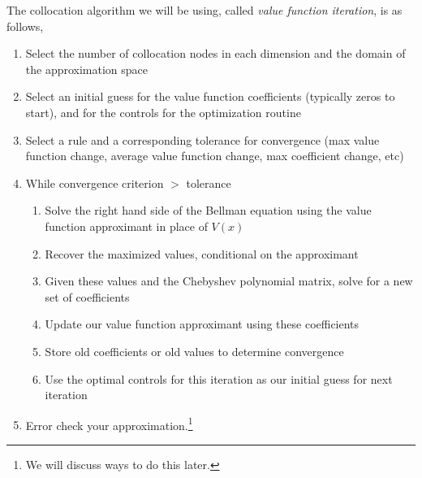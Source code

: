 \documentclass[11pt]{article}%
\begin{document}
The collocation algorithm we will be using, called \emph{value function iteration}, is as follows,
\begin{enumerate} \itemsep -.05in\vspace{-.1in}
	\item Select the number of collocation nodes in each dimension and the domain of the approximation space
	\item Select an initial guess for the value function coefficients (typically zeros to start), and for the controls for the optimization routine
	\item Select a rule and a corresponding tolerance for convergence (max value function change, average value function change, max coefficient change, etc)
	\item While convergence criterion $>$ tolerance
	\begin{enumerate}\itemsep -.05in\vspace{-.1in}
		\item Solve the right hand side of the Bellman equation using the value function approximant in place of $V(x)$
		\item Recover the maximized values, conditional on the approximant
		\item Given these values and the Chebyshev polynomial matrix, solve for a new set of coefficients
		\item Update our value function approximant using these coefficients
		\item Store old coefficients or old values to determine convergence
		\item Use the optimal controls for this iteration as our initial guess for next iteration
	\end{enumerate}\vspace{-.1in}
	\item Error check your approximation.\footnote{We will discuss ways to do this later.}
\end{enumerate}
\end{document}
